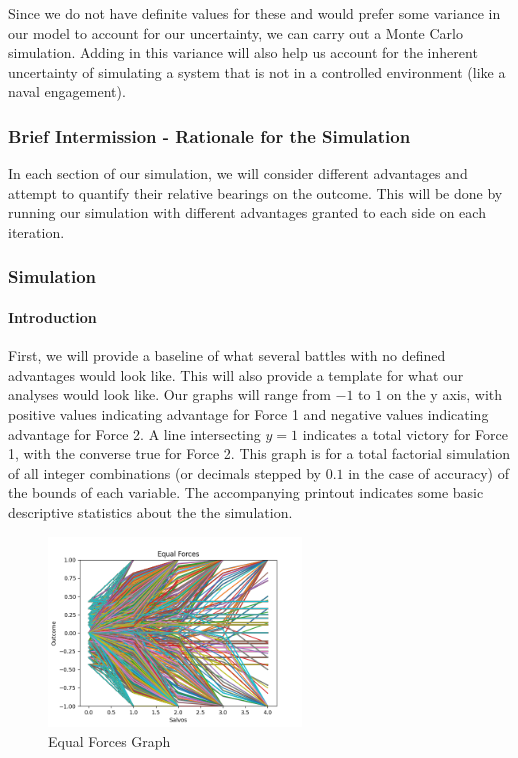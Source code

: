 Since we do not have definite values for these and would prefer some
variance in our model to account for our uncertainty, we can carry out a
Monte Carlo simulation. Adding in this variance will also help us
account for the inherent uncertainty of simulating a system that is not
in a controlled environment (like a naval engagement).

\hypertarget{brief-intermission---rationale-for-the-simulation}{%
\subsubsection{Brief Intermission - Rationale for the
Simulation}\label{brief-intermission---rationale-for-the-simulation}}

In each section of our simulation, we will consider different advantages
and attempt to quantify their relative bearings on the outcome. This
will be done by running our simulation with different advantages granted
to each side on each iteration.

\hypertarget{simulation}{%
\subsubsection{Simulation}\label{simulation}}

\hypertarget{introduction}{%
\paragraph{Introduction}\label{introduction}}

First, we will provide a baseline of what several battles with no
defined advantages would look like. This will also provide a template
for what our analyses would look like. Our graphs will range from \(-1\)
to \(1\) on the y axis, with positive values indicating advantage for
Force 1 and negative values indicating advantage for Force 2. A line
intersecting \(y=1\) indicates a total victory for Force 1, with the
converse true for Force 2. This graph is for a total factorial
simulation of all integer combinations (or decimals stepped by \(0.1\)
in the case of accuracy) of the bounds of each variable. The
accompanying printout indicates some basic descriptive statistics about
the the simulation.

\begin{figure}
\hypertarget{fig:refname}{%
\centering
\includegraphics[width=0.6\textwidth,height=\textheight]{figures/EqualForces.png}
\caption{Equal Forces Graph}\label{fig:refname}
}
\end{figure}

